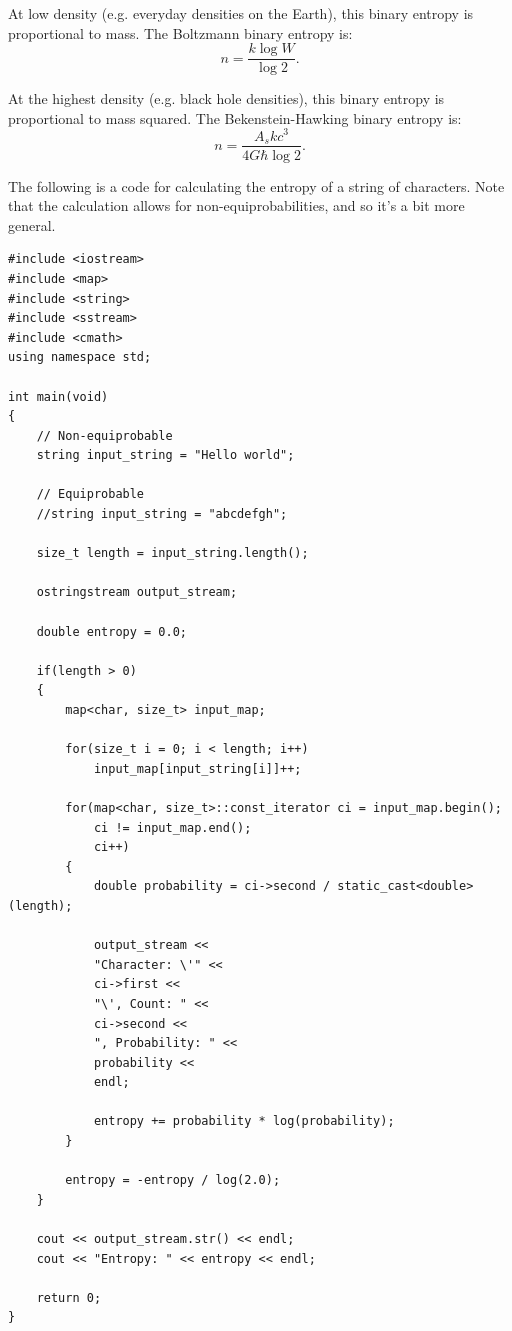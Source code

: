 \documentclass[12pt]{article}
\begin{document}
At low density (e.g. everyday densities on the Earth), this binary entropy is proportional to mass.
The Boltzmann binary entropy is:
\begin{equation}
n = \frac{k \log W}{\log 2}.
\end{equation}

At the highest density (e.g. black hole densities), this binary entropy is proportional to mass squared.
The Bekenstein-Hawking binary entropy is:
\begin{equation}
n = \frac{A_s k c^3}{ 4 G \hbar \log 2}.
\end{equation}

The following is a code for calculating the entropy of a string of characters.
Note that the calculation allows for non-equiprobabilities, and so it's a bit more general.
\begin{lstlisting}
#include <iostream>
#include <map>
#include <string>
#include <sstream>
#include <cmath>
using namespace std;

int main(void)
{
    // Non-equiprobable
    string input_string = "Hello world";

    // Equiprobable
    //string input_string = "abcdefgh";

    size_t length = input_string.length();

    ostringstream output_stream;
    
    double entropy = 0.0;
    
    if(length > 0)
    {
        map<char, size_t> input_map;

        for(size_t i = 0; i < length; i++)
            input_map[input_string[i]]++;
        
        for(map<char, size_t>::const_iterator ci = input_map.begin(); 
			ci != input_map.end(); 
			ci++)
        {
            double probability = ci->second / static_cast<double>(length);
            
            output_stream << 
			"Character: \'" << 
			ci->first << 
			"\', Count: " << 
			ci->second << 
			", Probability: " <<
			probability << 
			endl;
            
            entropy += probability * log(probability);
        }
        
        entropy = -entropy / log(2.0);
    }

    cout << output_stream.str() << endl;
    cout << "Entropy: " << entropy << endl;
    
    return 0;
}

\end{lstlisting}
\end{document}
